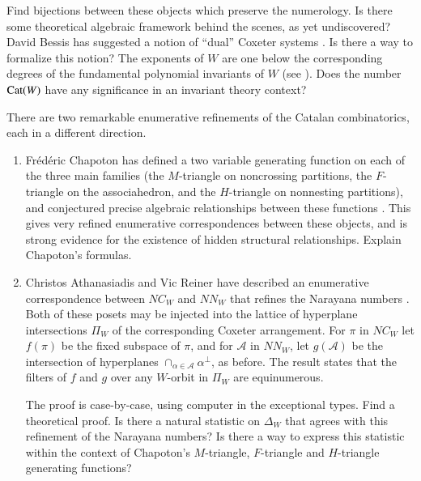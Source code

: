 \documentclass[12pt,letterpaper, reqno]{aimpl}
\newcommand{\Cat}{{\rm Cat}}
\newcommand{\A}{\mathcal A}
\begin{document}
\begin{problemblock}
\begin{problem}[1.2]
Find bijections between these objects which preserve the numerology. Is
there some theoretical algebraic framework behind the scenes, as
yet undiscovered? David Bessis has suggested a notion of ``dual''
Coxeter systems \cite{bessis:dual}. Is there a way to formalize this
notion? The exponents of $W$ are one below the corresponding degrees of
the fundamental polynomial invariants of $W$ (see \cite{humphries}). Does
the number $\Cat(W)$ have any significance in an invariant theory context?
\end{problem}

\begin{remark}
 There are two remarkable enumerative refinements of the Catalan combinatorics, each in a different direction.
\begin{enumerate}
\item Fr\'ed\'eric Chapoton has defined a two variable generating function
on each of the three main families (the $M$-triangle on noncrossing
partitions, the $F$-triangle on the associahedron, and the $H$-triangle
on nonnesting partitions), and conjectured precise algebraic relationships
between these functions \cite{chapoton:one,chapoton:two}. This gives very
refined enumerative correspondences between these objects, and is strong
evidence for the existence of hidden structural relationships. Explain
Chapoton's formulas.

\item Christos Athanasiadis and Vic Reiner have described an enumerative
correspondence between $NC_W$ and $NN_W$ that refines the Narayana numbers
\cite{athanasiadis-reiner}. Both of these posets may be injected into the
lattice of hyperplane intersections $\Pi_W$ of the corresponding Coxeter
arrangement. For $\pi$ in $NC_W$ let $f(\pi)$ be the fixed subspace
of $\pi$, and for $\A$ in $NN_W$, let $g(\A)$ be the intersection of
hyperplanes $\cap_{\alpha\in\A} \alpha^{\perp}$, as before. The result
states that the filters of $f$ and $g$ over any $W$-orbit in $\Pi_W$
are equinumerous.

The proof is case-by-case, using computer in the exceptional types. Find
a theoretical proof. Is there a natural statistic on $\Delta_W$ that
agrees with this refinement of the Narayana numbers? Is there a way to
express this statistic within the context of Chapoton's $M$-triangle,
$F$-triangle and $H$-triangle generating functions?
\end{enumerate}
\end{remark}


\end{problemblock}
\end{document}
